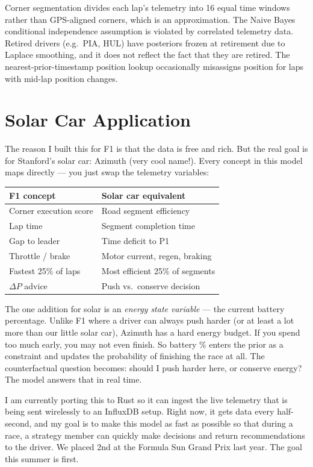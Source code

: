 \documentclass[10pt,twocolumn]{article}
\begin{document}
Corner segmentation divides each lap's telemetry into 16 equal time windows
rather than GPS-aligned corners, which is an approximation. The Naive Bayes
conditional independence assumption is violated by correlated telemetry
data. Retired drivers (e.g.\ PIA, HUL) have posteriors frozen at
retirement due to Laplace smoothing, and it does not reflect the fact that they are retired. The nearest-prior-timestamp
position lookup occasionally misassigns position for laps with mid-lap
position changes.

\section{Solar Car Application}

The reason I built this for F1 is that the data is free and rich. But the real
goal is for Stanford's solar car: Azimuth (very cool name!). Every concept in this model maps directly ---
you just swap the telemetry variables:

\vspace{4pt}
\begin{tabular}{@{}ll@{}}
\toprule
\textbf{F1 concept} & \textbf{Solar car equivalent} \\
\midrule
Corner execution score & Road segment efficiency \\
Lap time               & Segment completion time \\
Gap to leader          & Time deficit to P1 \\
Throttle / brake       & Motor current, regen, braking \\
Fastest 25\% of laps   & Most efficient 25\% of segments \\
$\Delta P$ advice      & Push vs.\ conserve decision \\
\bottomrule
\end{tabular}
\vspace{4pt}

The one addition for solar is an \textit{energy state variable} --- the current
battery percentage. Unlike F1 where a driver can always push harder (or at least a lot more than our little solar car),
 Azimuth has a hard energy budget. If you spend too much early, you may not even finish. So
battery \% enters the prior as a constraint and updates the probability of
finishing the race at all. The counterfactual question becomes: should I push
harder here, or conserve energy? The model answers that in real time.

I am currently porting this to Rust so it can ingest the live telemetry that is being sent wirelessly to an InfluxDB setup. Right now, it gets 
data every half-second, and my goal is to make this model as fast as possible so that during a race, a strategy member can quickly
make decisions and return recommendations to the driver. We placed 2nd at the Formula Sun Grand Prix last year. The goal this summer is
first.
\end{document}
